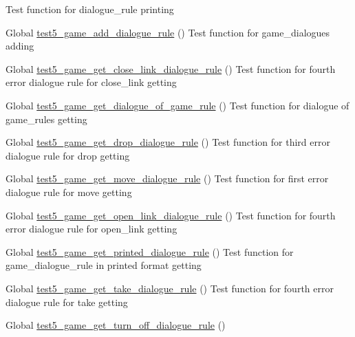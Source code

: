 \begin{DoxyRefList}
%
Test function for dialogue\+\_\+rule printing  
\item[Global \mbox{\hyperlink{game__test_8c_aa6e1cf0b18dd9053910a05213a061102}{test5\+\_\+game\+\_\+add\+\_\+dialogue\+\_\+rule}} ()]\label{test__test000298}%
%
Test function for game\+\_\+dialogues adding  
\item[Global \mbox{\hyperlink{game__test_8c_aacef64de7eb9ddfd2ee7768b0f83c1e7}{test5\+\_\+game\+\_\+get\+\_\+close\+\_\+link\+\_\+dialogue\+\_\+rule}} ()]\label{test__test000381}%
%
Test function for fourth error dialogue rule for close\+\_\+link getting  
\item[Global \mbox{\hyperlink{game__test_8c_ac98ddf01e990c3bc93d47129a2a1fdfc}{test5\+\_\+game\+\_\+get\+\_\+dialogue\+\_\+of\+\_\+game\+\_\+rule}} ()]\label{test__test000391}%
%
Test function for dialogue of game\+\_\+rules getting  
\item[Global \mbox{\hyperlink{game__test_8c_a140d3285da6cee1ea32323d0cb12cbeb}{test5\+\_\+game\+\_\+get\+\_\+drop\+\_\+dialogue\+\_\+rule}} ()]\label{test__test000348}%
%
Test function for third error dialogue rule for drop getting  
\item[Global \mbox{\hyperlink{game__test_8c_afddb1b692877eb9b0ae4fcc013fea76a}{test5\+\_\+game\+\_\+get\+\_\+move\+\_\+dialogue\+\_\+rule}} ()]\label{test__test000328}%
%
Test function for first error dialogue rule for move getting  
\item[Global \mbox{\hyperlink{game__test_8c_a7a94c6f24269b68cef8a6dc943211377}{test5\+\_\+game\+\_\+get\+\_\+open\+\_\+link\+\_\+dialogue\+\_\+rule}} ()]\label{test__test000371}%
%
Test function for fourth error dialogue rule for open\+\_\+link getting  
\item[Global \mbox{\hyperlink{game__test_8c_acbb12c9deeac208fccede1a3e20e5b0c}{test5\+\_\+game\+\_\+get\+\_\+printed\+\_\+dialogue\+\_\+rule}} ()]\label{test__test000315}%
%
Test function for game\+\_\+dialogue\+\_\+rule in printed format getting  
\item[Global \mbox{\hyperlink{game__test_8c_adfd95e7708c420cc8ab1021f6e330d87}{test5\+\_\+game\+\_\+get\+\_\+take\+\_\+dialogue\+\_\+rule}} ()]\label{test__test000339}%
%
Test function for fourth error dialogue rule for take getting  
\item[Global \mbox{\hyperlink{game__test_8c_a289d63f30a37476133401eea02b258de}{test5\+\_\+game\+\_\+get\+\_\+turn\+\_\+off\+\_\+dialogue\+\_\+rule}} ()]\label{test__test000365}%

\end{DoxyRefList}
